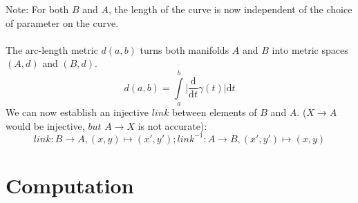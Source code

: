 \documentclass{report}
\begin{document}
Note: For both $B$ and $A$, the length of the curve is now independent of the choice of parameter on the curve. ~\cite[1.1]{Taimanov}\\\\
The arc-length metric $d(a,b)$ turns both manifolds $A$ and $B$ into metric spaces $(A,d)$ and $(B,d)$. ~\cite[1.1.3]{Klingenberg}
\begin{equation}
d(a,b) = \int \limits _{a}^{b}\lvert \frac{\mathrm{d}}{\mathrm{d}t}\gamma(t)\rvert \mathrm{d}t\label{eq:1}
\end{equation}
We can now establish an injective $link$ between elements of $B$ and $A$. ($X \rightarrow A$ would be injective, $but$ $A \rightarrow X$ is not accurate):
\begin{equation}
link: B \rightarrow A, (x,y) \mapsto (x',y'); link^{-1}: A \rightarrow B, (x',y') \mapsto (x,y)
\end{equation}

\chapter{Computation}
\end{document}
